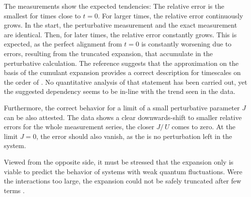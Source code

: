 The measurements show the expected tendencies: The relative error is the smallest for times close to $t=0$. For larger times, the relative error continuously grows.
In the start, the perturbative measurement and the exact measurement are identical.
Then, for later times, the relative error constantly grows.
This is expected, as the perfect alignment from $t=0$ is constantly worsening due to errors, resulting from the truncated expansion, that accumulate in the perturbative calculation.
The reference \cite{variationalClassicalNetworksPaper} suggests that the approximation on the basis of the cumulant expansion provides a correct description for timescales on the order of .
No quantitative analysis of that statement has been carried out, yet the suggested dependency seems to be in-line with the trend seen in the data.

Furthermore, the correct behavior for a limit of a small perturbative parameter $J$ can be also attested.
The data shows a clear downwards-shift to smaller relative errors for the whole measurement series, the closer $J/\,U$ comes to zero.
At the limit $J=0$, the error should also vanish, as the is no perturbation left in the system.

Viewed from the opposite side, it must be stressed that the expansion only is viable to predict the behavior of systems with weak quantum fluctuations. 
Were the interactions too large, the expansion could not be safely truncated after few terms \cite{variationalClassicalNetworksPaper}.



